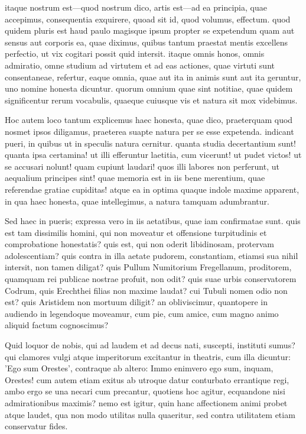  itaque nostrum est—quod nostrum dico, artis est—ad ea principia, quae accepimus, consequentia exquirere, quoad sit id, quod volumus, effectum. quod quidem pluris est haud paulo magisque ipsum propter se expetendum quam aut sensus aut corporis ea, quae diximus, quibus tantum praestat mentis excellens perfectio, ut vix cogitari possit quid intersit. itaque omnis honos, omnis admiratio, omne studium ad virtutem et ad eas actiones, quae virtuti sunt consentaneae, refertur, eaque omnia, quae aut ita in animis sunt aut ita geruntur, uno nomine honesta dicuntur. quorum omnium quae sint notitiae, quae quidem significentur rerum vocabulis, quaeque cuiusque vis et natura sit mox videbimus.

 Hoc autem loco tantum explicemus haec honesta, quae dico, praeterquam quod nosmet ipsos diligamus, praeterea suapte natura per se esse expetenda. indicant pueri, in quibus ut in speculis natura cernitur. quanta studia decertantium sunt! quanta ipsa certamina! ut illi efferuntur laetitia, cum vicerunt! ut pudet victos! ut se accusari nolunt! quam cupiunt laudari! quos illi labores non perferunt, ut aequalium principes sint! quae memoria est in iis bene merentium, quae referendae gratiae cupiditas! atque ea in optima quaque indole maxime apparent, in qua haec honesta, quae intellegimus, a natura tamquam adumbrantur.

 Sed haec in pueris; expressa vero in iis aetatibus, quae iam confirmatae sunt. quis est tam dissimilis homini, qui non moveatur et offensione turpitudinis et comprobatione honestatis? quis est, qui non oderit libidinosam, protervam adolescentiam? quis contra in illa aetate pudorem, constantiam, etiamsi sua nihil intersit, non tamen diligat? quis Pullum Numitorium Fregellanum, proditorem, quamquam rei publicae nostrae profuit, non odit? quis suae urbis conservatorem Codrum, quis Erechthei filias non maxime laudat? cui Tubuli nomen odio non est? quis Aristidem non mortuum diligit? an obliviscimur, quantopere in audiendo in legendoque moveamur, cum pie, cum amice, cum magno animo aliquid factum cognoscimus?

 Quid loquor de nobis, qui ad laudem et ad decus nati, suscepti, instituti sumus? qui clamores vulgi atque imperitorum excitantur in theatris, cum illa dicuntur: 'Ego sum Orestes', contraque ab altero: Immo enimvero ego sum, inquam, Orestes! cum autem etiam exitus ab utroque datur conturbato errantique regi, ambo ergo se una necari cum precantur, quotiens hoc agitur, ecquandone nisi admirationibus maximis? nemo est igitur, quin hanc affectionem animi probet atque laudet, qua non modo utilitas nulla quaeritur, sed contra utilitatem etiam conservatur fides.

